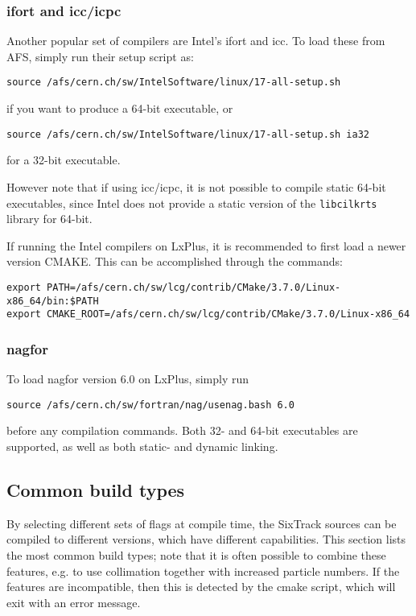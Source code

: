 \documentclass[english,BCOR=0mm,DIV=18]{scrartcl}
\begin{document}

\subsubsection{ifort and icc/icpc}
Another popular set of compilers are Intel's ifort and icc.
To load these from AFS, simply run their setup script as:
\begin{lstlisting}
source /afs/cern.ch/sw/IntelSoftware/linux/17-all-setup.sh
\end{lstlisting}
if you want to produce a 64-bit executable, or
\begin{lstlisting}
source /afs/cern.ch/sw/IntelSoftware/linux/17-all-setup.sh ia32
\end{lstlisting}
for a 32-bit executable.

However note that if using icc/icpc, it is not possible to compile static 64-bit executables, since Intel does not provide a static version of the \texttt{libcilkrts} library for 64-bit.

If running the Intel compilers on LxPlus, it is recommended to first load a newer version CMAKE.
This can be accomplished through the commands:
\begin{lstlisting}
export PATH=/afs/cern.ch/sw/lcg/contrib/CMake/3.7.0/Linux-x86_64/bin:$PATH
export CMAKE_ROOT=/afs/cern.ch/sw/lcg/contrib/CMake/3.7.0/Linux-x86_64
\end{lstlisting} %

\subsubsection{nagfor}

To load nagfor version 6.0 on LxPlus, simply run
\begin{lstlisting}
source /afs/cern.ch/sw/fortran/nag/usenag.bash 6.0
\end{lstlisting}
before any compilation commands.
Both 32- and 64-bit executables are supported, as well as both static- and dynamic linking.


\subsection{Common build types}
\label{sec:building:options}
By selecting different sets of flags at compile time, the SixTrack sources can be compiled to different versions, which have different capabilities.
This section lists the most common build types; note that it is often possible to combine these features, e.g. to use collimation together with increased particle numbers.
If the features are incompatible, then this is detected by the cmake script, which will exit with an error message.
\end{document}
